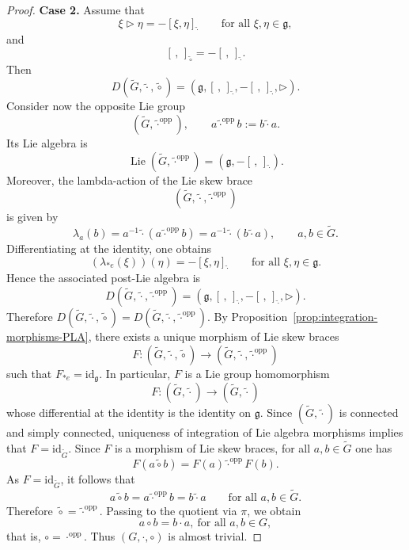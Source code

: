 \documentclass[reqno]{amsart}
\newcommand{\g}{\mathfrak{g}}
\DeclareMathOperator{\Lie}{Lie}
\newcommand{\id}{\mathrm{id}}
\begin{document}
\begin{proof}
\medskip
\noindent
\textbf{Case 2.}
Assume that
\[
\xi\triangleright \eta=-[\xi,\eta]_{\widetilde\cdot}
\qquad\text{for all }\xi,\eta\in\g,
\]
and
\[
[\, ,\,]_{\widetilde\circ}=-[\, ,\,]_{\widetilde\cdot}.
\]
Then
\[
D(\widetilde G,\widetilde\cdot,\widetilde\circ)
=
(\g,[\, ,\,]_{\widetilde\cdot},- [\, ,\,]_{\widetilde\cdot},\triangleright).
\]
Consider now the opposite Lie group
\[
(\widetilde G,\widetilde\cdot^{\mathrm{opp}}),
\qquad
a\widetilde\cdot^{\mathrm{opp}} b:=b\widetilde\cdot a.
\]
Its Lie algebra is
\[
\Lie(\widetilde G,\widetilde\cdot^{\mathrm{opp}})
=
(\g,-[\, ,\,]_{\widetilde\cdot}).
\]
Moreover, the lambda-action of the Lie skew brace
\[
(\widetilde G,\widetilde\cdot,\widetilde\cdot^{\mathrm{opp}})
\]
is given by
\[
\lambda_a(b)
=
a^{-1}\widetilde\cdot
(a\widetilde\cdot^{\mathrm{opp}} b)
=
a^{-1}\widetilde\cdot (b\widetilde\cdot a),
\qquad a,b\in \widetilde G.
\]
Differentiating at the identity, one obtains
\[
(\lambda_{*e}(\xi))(\eta)=-[\xi,\eta]_{\widetilde\cdot}
\qquad\text{for all }\xi,\eta\in\g.
\]
Hence the associated post-Lie algebra is
\[
D(\widetilde G,\widetilde\cdot,\widetilde\cdot^{\mathrm{opp}})
=
(\g,[\, ,\,]_{\widetilde\cdot},- [\, ,\,]_{\widetilde\cdot},\triangleright).
\]
Therefore
$D(\widetilde G,\widetilde\cdot,\widetilde\circ)
=
D(\widetilde G,\widetilde\cdot,\widetilde\cdot^{\mathrm{opp}})$.
By Proposition~\ref{prop:integration-morphisms-PLA}, there exists a unique
morphism of Lie skew braces
\[
F:(\widetilde G,\widetilde\cdot,\widetilde\circ)\longrightarrow
(\widetilde G,\widetilde\cdot,\widetilde\cdot^{\mathrm{opp}})
\]
such that
$F_{*e}=\id_{\g}$.
In particular, \(F\) is a Lie group homomorphism
\[
F:(\widetilde G,\widetilde\cdot)\longrightarrow
(\widetilde G,\widetilde\cdot)
\]
whose differential at the identity is the identity on \(\g\). Since
\((\widetilde G,\widetilde\cdot)\) is connected and simply connected,
uniqueness of integration of Lie algebra morphisms implies that
$F=\id_{\widetilde G}$.
Since \(F\) is a morphism of Lie skew braces, for all \(a,b\in \widetilde G\)
one has
\[
F(a\widetilde\circ b)=F(a)\widetilde\cdot^{\mathrm{opp}}F(b).
\]
As \(F=\id_{\widetilde G}\), it follows that
\[
a\widetilde\circ b
=
a\widetilde\cdot^{\mathrm{opp}} b
=
b\widetilde\cdot a
\qquad\text{for all }a,b\in \widetilde G.
\]
Therefore
$\widetilde\circ=\widetilde\cdot^{\mathrm{opp}}$.
Passing to the quotient via \(\pi\), we obtain
\[
a\circ b=b\cdot a, \ \text{for all }a,b\in G,
\]
that is,
$\circ=\cdot^{\mathrm{opp}}$.
Thus \((G,\cdot,\circ)\) is almost trivial.
\end{proof}
\end{document}

